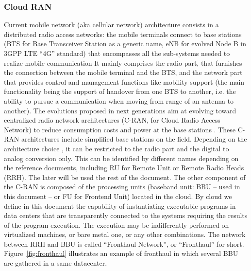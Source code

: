 \documentclass[a4paper,10pt]{article}
\begin{document}
\subsubsection{Cloud RAN}
Current mobile network (aka cellular network) architecture consists in a distributed radio access networks: the mobile terminals connect to base stations (BTS for Base Transceiver Station as a generic name, eNB for evolved Node B in 3GPP LTE “4G” standard) that encompasses all the sub-systems needed to realize mobile communication \cite{bouguen2012lte} It mainly comprises the radio part, that furnishes the connection between the mobile terminal and the BTS, and the network part that provides control and management functions like mobility support (the main functionality being the support of handover from one BTS to another, i.e. the ability to pursue a communication when moving from range of an antenna to another). The evolutions proposed in next generations aim at evolving toward centralized radio network architectures (C-RAN, for Cloud Radio Access Network) to reduce consumption costs and power at the base stations \cite{mobile2011c}. These C-RAN architectures include simplified base stations on the field. Depending on the architecture choice  
, it can be restricted to the radio part and the digital to analog conversion only. This can be identified by different names depending on the reference documents, including RU for Remote Unit or Remote Radio Heads (RRH). The later will be used the rest of the document. The other component of the C-RAN is composed of the processing units (baseband unit: BBU – used in this document – or FU for Frontend Unit) located in the cloud. By cloud we define in this document the capability of instantiating executable programs in data centers that are transparently connected to the systems requiring the results of the program execution. The execution may be indifferently performed on virtualized machines, or bare metal one, or any other combinations. The network between RRH and BBU is called “Fronthaul Network”, or “Fronthaul” for short. Figure~\ref{fig:fronthaul} illustrates an example of fronthaul in which several BBU are gathered in a same datacenter. 
\end{document}
